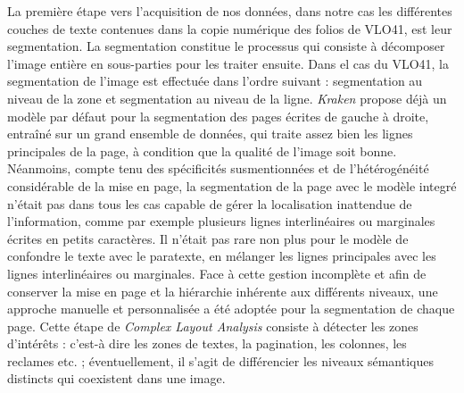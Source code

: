 \documentclass[a4paper, twoside, 12pt]{book}
\begin{document}
La première étape vers l'acquisition de nos données, dans notre cas les différentes couches de texte contenues dans la copie numérique des folios de VLO41, est leur segmentation. La segmentation constitue le processus qui consiste à décomposer l'image entière en sous-parties pour les traiter ensuite. Dans el cas du VLO41, la segmentation de l'image est effectuée dans l'ordre suivant : segmentation au niveau de la zone et segmentation au niveau de la ligne. \textit{Kraken} propose déjà un modèle par défaut pour la segmentation des pages écrites de gauche à droite, entraîné sur un grand ensemble de données, qui traite assez bien les lignes principales de la page, à condition que la qualité de l'image soit bonne. Néanmoins, compte tenu des spécificités susmentionnées et de l'hétérogénéité considérable de la mise en page, la segmentation de la page avec le modèle integré n'était pas dans tous les cas capable de gérer la localisation inattendue de l'information, comme par exemple plusieurs lignes interlinéaires ou marginales écrites en petits caractères. Il n'était pas rare non plus pour le modèle de confondre le texte avec le paratexte, en mélanger les lignes principales avec les lignes interlinéaires ou marginales. Face à cette gestion incomplète et afin de conserver la mise en page et la hiérarchie inhérente aux différents niveaux, une approche manuelle et personnalisée a été adoptée pour la segmentation de chaque page. Cette étape de \textit{Complex Layout Analysis} consiste à détecter les zones d’intérêts : c’est-à dire les zones de textes, la pagination, les colonnes, les reclames etc. ; éventuellement, il s'agit de différencier les niveaux sémantiques distincts qui coexistent dans une image. 
\end{document}
